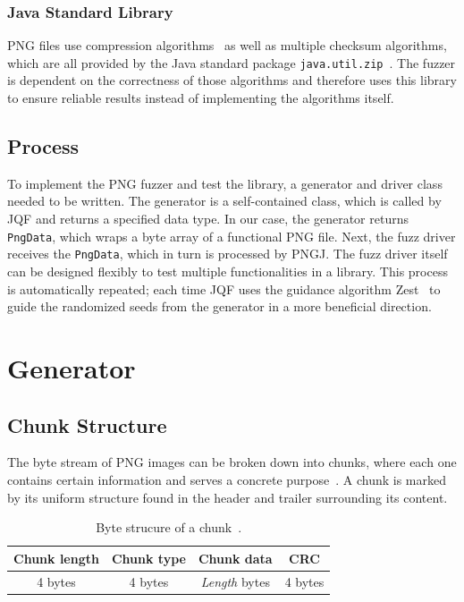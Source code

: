 \documentclass[runningheads]{llncs}
\begin{document}
\subsubsection{Java Standard Library}
PNG files use compression algorithms~\cite{rfc_deflate_compression} as well as multiple checksum algorithms, which are all provided by the Java standard package \texttt{java.util.zip}~\cite{java_util_zip_docs}. The fuzzer is dependent on the correctness of those algorithms and therefore uses this library to ensure reliable results instead of implementing the algorithms itself.
\subsection{Process}
To implement the PNG fuzzer and test the library, a generator and driver class needed to be written. The generator is a self-contained class, which is called by JQF and returns a specified data type. In our case, the generator returns \texttt{PngData}, which wraps a byte array of a functional PNG file. Next, the fuzz driver receives the \texttt{PngData}, which in turn is processed by PNGJ. The fuzz driver itself can be designed flexibly to test multiple functionalities in a library. This process is automatically repeated; each time JQF uses the guidance algorithm Zest~\cite{zest_guidance} to guide the randomized seeds from the generator in a more beneficial direction.
\section{Generator}
\label{generator}
\subsection{Chunk Structure}
\label{chunk_structure}
The byte stream of PNG images can be broken down into chunks, where each one contains certain information and serves a concrete purpose~\cite{libpng_chunks}. A chunk is marked by its uniform structure found in the header and trailer surrounding its content.
\bgroup
\def\arraystretch{1.5}
\setlength\tabcolsep{1.5ex}
    \begin{table}
        \caption{Byte strucure of a chunk~\cite{libpng_file_structure}.}
        \label{tab1}
        \begin{center}
            \begin{tabular}{|c|c|c|c|}
                \hline 
                \textbf{Chunk length} & \textbf{Chunk type} & \textbf{Chunk data} & \textbf{CRC} \\
                \hline \hline
                4 bytes               & 4 bytes             & \textit{Length} bytes        & 4 bytes \\
                \hline
            \end{tabular}              
        \end{center}
    \end{table}
\egroup
\end{document}
